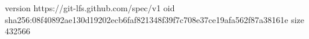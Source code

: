 version https://git-lfs.github.com/spec/v1
oid sha256:08f40892ae130d19202ecb6faf821348f39f7c708e37ce19afa562f87a38161e
size 432566
